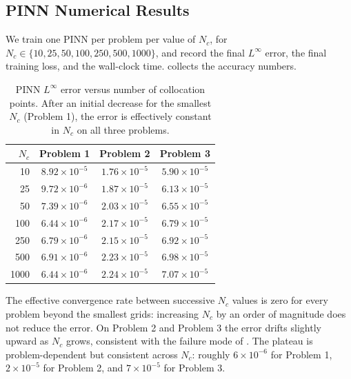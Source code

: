 \documentclass[11pt]{article}
\theoremstyle{plain}
\theoremstyle{remark}
\newcommand{\Linf}{L^\infty}
\begin{document}
\subsection{PINN Numerical Results}
\label{sec:pinn_results}

We train one PINN per problem per value of $N_c$, for
$N_c \in \{10, 25, 50, 100, 250, 500, 1000\}$, and record the final
$\Linf$ error, the final training loss, and the wall-clock time.
 collects the accuracy numbers.

\begin{table}[h]
\centering
\small
\begin{tabular}{r|ccc}
\toprule
$N_c$ & \textbf{Problem 1} & \textbf{Problem 2} & \textbf{Problem 3} \\
\midrule
10    & $8.92 \times 10^{-5}$ & $1.76 \times 10^{-5}$ & $5.90 \times 10^{-5}$ \\
25    & $9.72 \times 10^{-6}$ & $1.87 \times 10^{-5}$ & $6.13 \times 10^{-5}$ \\
50    & $7.39 \times 10^{-6}$ & $2.03 \times 10^{-5}$ & $6.55 \times 10^{-5}$ \\
100   & $6.44 \times 10^{-6}$ & $2.17 \times 10^{-5}$ & $6.79 \times 10^{-5}$ \\
250   & $6.79 \times 10^{-6}$ & $2.15 \times 10^{-5}$ & $6.92 \times 10^{-5}$ \\
500   & $6.91 \times 10^{-6}$ & $2.23 \times 10^{-5}$ & $6.98 \times 10^{-5}$ \\
1000  & $6.44 \times 10^{-6}$ & $2.24 \times 10^{-5}$ & $7.07 \times 10^{-5}$ \\
\bottomrule
\end{tabular}
\caption{PINN $\Linf$ error versus number of collocation points. After an
         initial decrease for the smallest $N_c$ (Problem 1), the error
         is effectively constant in $N_c$ on all three problems.}
\label{tab:pinn_sweep}
\end{table}

The effective convergence rate between successive $N_c$ values is zero
for every problem beyond the smallest grids: increasing $N_c$ by an order
of magnitude does not reduce the error. On Problem 2 and Problem 3 the
error drifts slightly upward as $N_c$ grows, consistent with the
failure mode of \citet{wang2022}. The plateau is problem-dependent but
consistent across $N_c$: roughly $6 \times 10^{-6}$ for Problem 1,
$2 \times 10^{-5}$ for Problem 2, and $7 \times 10^{-5}$ for Problem 3.
\end{document}
